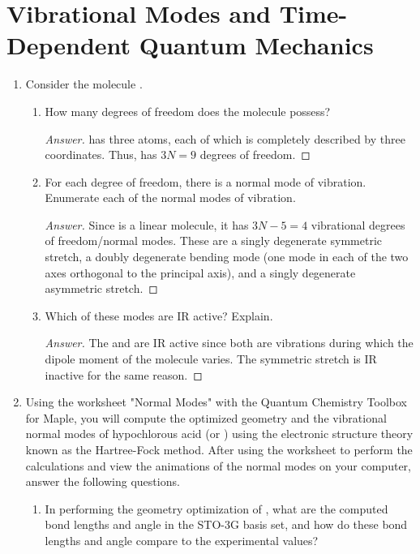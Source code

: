 \documentclass[../psets.tex]{subfiles}
\begin{document}
\section{Vibrational Modes and Time-Dependent Quantum Mechanics}
\begin{enumerate}
    \item {}Consider the molecule .
    \begin{enumerate}
        \item How many degrees of freedom does the molecule possess?
        \begin{proof}[Answer]
             has three atoms, each of which is completely described by three coordinates. Thus,  has $3N=\boxed{9}$ degrees of freedom.
        \end{proof}
        \item For each degree of freedom, there is a normal mode of vibration. Enumerate each of the normal modes of vibration.
        \begin{proof}[Answer]
            Since  is a linear molecule, it has $3N-5=4$ vibrational degrees of freedom/normal modes. These are a singly degenerate symmetric stretch, a doubly degenerate bending mode (one mode in each of the two axes orthogonal to the principal axis), and a singly degenerate asymmetric stretch.
        \end{proof}
        \item Which of these modes are IR active? Explain.
        \begin{proof}[Answer]
            The  and  are IR active since both are vibrations during which the dipole moment of the molecule varies. The symmetric stretch is IR inactive for the same reason.
        \end{proof}
    \end{enumerate}
    \item Using the worksheet "Normal Modes" with the Quantum Chemistry Toolbox for Maple, you will compute the optimized geometry and the vibrational normal modes of hypochlorous acid (or ) using the electronic structure theory known as the Hartree-Fock method. After using the worksheet to perform the calculations and view the animations of the normal modes on your computer, answer the following questions.
    \begin{enumerate}
        \item In performing the geometry optimization of , what are the computed bond lengths and angle in the STO-3G basis set, and how do these bond lengths and angle compare to the experimental values?

\end{enumerate}
\end{enumerate}
\end{document}
